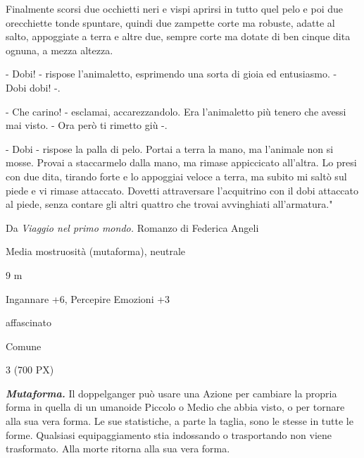 \begin{multicols}{2}
{{Finalmente scorsi due occhietti neri e vispi aprirsi in tutto quel pelo e poi due orecchiette tonde spuntare, quindi due zampette corte ma robuste, adatte al salto, appoggiate a terra e altre due, sempre corte ma dotate di ben cinque dita ognuna, a mezza altezza.

- Dobi! - rispose l'animaletto, esprimendo una sorta di gioia ed entusiasmo. - Dobi dobi! -.

- Che carino! - esclamai, accarezzandolo. Era l'animaletto più tenero che avessi mai visto. - Ora però ti rimetto giù -.

- Dobi - rispose la palla di pelo.
Portai a terra la mano, ma l'animale non si mosse. Provai a staccarmelo dalla mano, ma rimase appiccicato all'altra. Lo presi con due dita, tirando forte e lo appoggiai veloce a terra, ma subito mi saltò sul piede e vi rimase attaccato. Dovetti attraversare l'acquitrino con il dobi attaccato al piede, senza contare gli altri quattro che trovai avvinghiati all'armatura."}

Da \emph{Viaggio nel primo mondo.} Romanzo di Federica Angeli

\begin{description}[noitemsep, topsep=0pt, parsep=0pt, partopsep=0pt, itemsep=1pt, leftmargin=2.35cm,  labelwidth=2.2cm, itemindent=0cm, listparindent=0pt] %
\setlength{\baselineskip}{10pt}
\item[\textbf{Taglia/Tipo}] Media mostruosità (mutaforma), neutrale
\item[\textbf{Caratt.}] 
\item[\textbf{Punti Ferita}] 
\item[\textbf{Movimento}] 9 m
\item[\textbf{Tiri Salvez.}] 
\item[\textbf{Comp.}] Ingannare +6, Percepire Emozioni +3
\item[\textbf{Immunità}] affascinato
\item[\textbf{Sensi}] 
\item[\textbf{Linguaggi}] Comune
\item[\textbf{Sfida}] 3 (700 PX)
\end{description}
\smallskip

\emph{\textbf{Mutaforma.}} Il doppelganger può usare una Azione per cambiare la propria forma in quella di un umanoide Piccolo o Medio che abbia visto, o per tornare alla sua vera forma. Le sue statistiche, a parte la taglia, sono le stesse in tutte le forme. Qualsiasi equipaggiamento stia indossando o trasportando non viene trasformato. Alla morte ritorna alla sua vera forma.

}
\end{multicols}
